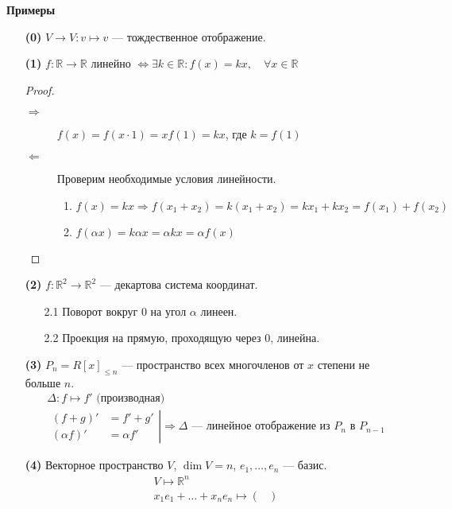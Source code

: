 \vspace{0.3cm}
\textbf{Примеры}
\begin{itemize}
\item[\textbf{(0)}] $V \rightarrow V: v \mapsto v$ --- тождественное отображение.
\item[\textbf{(1)}] $f: \mathbb{R} \rightarrow \mathbb{R}$ линейно $\Leftrightarrow \exists k \in \mathbb{R}: f(x) = kx, \quad \forall x \in \mathbb{R}$
\begin{proof} \
\begin{description}
\item[$\Rightarrow$] $f(x) = f(x \cdot 1) = xf(1) = kx$, где $k = f(1)$
\item[$\Leftarrow$] Проверим необходимые условия линейности.
\begin{enumerate}
\item $f(x) = kx \Rightarrow f(x_1 + x_2) = k(x_1 + x_2) = kx_1 + kx_2 = f(x_1) + f(x_2)$
\item $f(\alpha x) = k\alpha x = \alpha k x = \alpha f(x)$
\end{enumerate}
\end{description}
\end{proof}
\item[\textbf{(2)}] $f: \mathbb{R}^2 \rightarrow \mathbb{R}^2$ --- декартова система координат.
\begin{itemize}
\item[2.1] Поворот вокруг 0 на угол $\alpha$ линеен.
\item[2.2] Проекция на прямую, проходящую через 0, линейна.
\end{itemize}
\item[\textbf{(3)}] $P_n = R[x]_{\leqslant n}$ --- пространство всех многочленов от $x$ степени не больше $n$.
\begin{gather*}
\Delta : f \mapsto f' \text{ (производная)} \\
\left.
\begin{aligned}
(f+g)' &= f' + g' \\
(\alpha f)' &= \alpha f'
\end{aligned}
\right| \Rightarrow \Delta \text{ --- линейное отображение из $P_n$ в $P_{n-1}$}
\end{gather*}
\item[\textbf{(4)}] Векторное пространство $V$, $\dim V = n$, $e_1, \ldots, e_n$ --- базис.
\begin{gather*}
V \mapsto \mathbb{R}^n \\
x_1e_1 + \ldots + x_ne_n \mapsto 
\begin{pmatrix*}

\end{pmatrix*}
\end{gather*}
\end{itemize}
